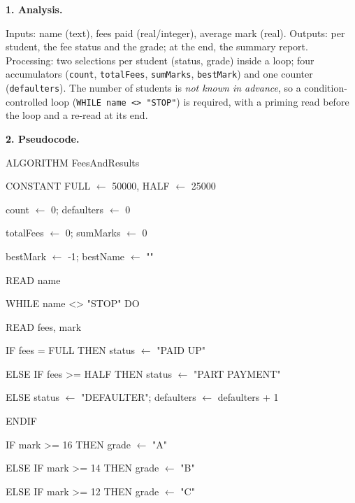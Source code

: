 \documentclass[11pt]{article}
\newcommand{\cle}[1]{{\popxbold\color{popdark}#1}}
\newcounter{popsec}
\newcounter{popsub}
\newcommand{\courssub}[1]{%
  \stepcounter{popsub}%
  \par\vspace{9pt}\noindent{\popxbold\fontsize{11.5}{13}\selectfont\color{popink}{\color{poporange}\thepopsec.\thepopsub}\hspace{6pt}#1}\par\nopagebreak\vspace{4pt}
}
\begin{document}
\courssub{Model answer}

\textbf{1. Analysis.}\par
Inputs: name (text), fees paid (real/integer), average mark (real). Outputs: per student, the fee status and the grade; at the end, the summary report. Processing: two selections per student (status, grade) inside a loop; four accumulators (\texttt{count}, \texttt{totalFees}, \texttt{sumMarks}, \texttt{bestMark}) and one counter (\texttt{defaulters}). The number of students is \emph{not known in advance}, so a \cle{condition-controlled} loop (\texttt{WHILE name <> "STOP"}) is required, with a priming read before the loop and a re-read at its end.

\textbf{2. Pseudocode.}\par
\begin{exemplebox}
\begin{ttfamily}
ALGORITHM FeesAndResults\par
CONSTANT FULL $\leftarrow$ 50000, HALF $\leftarrow$ 25000\par
count $\leftarrow$ 0; defaulters $\leftarrow$ 0\par
totalFees $\leftarrow$ 0; sumMarks $\leftarrow$ 0\par
bestMark $\leftarrow$ -1; bestName $\leftarrow$ ""\par
READ name\par
WHILE name <> "STOP" DO\par
\hspace*{1em}READ fees, mark\par
\hspace*{1em}IF fees = FULL THEN status $\leftarrow$ "PAID UP"\par
\hspace*{1em}ELSE IF fees >= HALF THEN status $\leftarrow$ "PART PAYMENT"\par
\hspace*{1em}ELSE status $\leftarrow$ "DEFAULTER"; defaulters $\leftarrow$ defaulters + 1\par
\hspace*{1em}ENDIF\par
\hspace*{1em}IF mark >= 16 THEN grade $\leftarrow$ "A"\par
\hspace*{1em}ELSE IF mark >= 14 THEN grade $\leftarrow$ "B"\par
\hspace*{1em}ELSE IF mark >= 12 THEN grade $\leftarrow$ "C"\par

\end{ttfamily}
\end{exemplebox}
\end{document}
